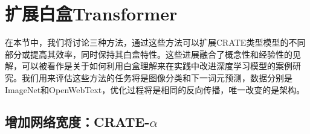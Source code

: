 \documentclass[../../book-main_zh.tex]{subfiles}
\begin{document}




\section{扩展白盒Transformer}\label{sec:scalable}

在本节中，我们将讨论三种方法，通过这些方法可以扩展CRATE类型模型的不同部分或提高其效率，同时保持其白盒特性。这些进展融合了概念性和经验性的见解，可以被看作是关于如何利用白盒理解来在实践中改进深度学习模型的案例研究。我们用来评估这些方法的任务将是图像分类和下一词元预测，数据分别是ImageNet和OpenWebText，优化过程将是相同的反向传播，唯一改变的是架构。

\subsection{增加网络宽度：CRATE-\texorpdfstring{\(\alpha\)}{alpha}}\label{sub:crate_alpha_experiments}
\end{document}
